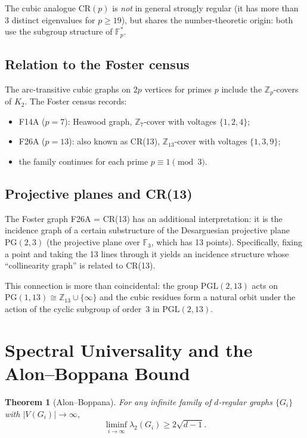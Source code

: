 \documentclass[11pt,a4paper]{article}
\theoremstyle{plain}
\newtheorem{theorem}{Theorem}
\theoremstyle{definition}
\theoremstyle{remark}
\newcommand{\Z}{\mathbb{Z}}
\newcommand{\F}{\mathbb{F}}
\newcommand{\CR}{\mathrm{CR}}
\begin{document}
The cubic analogue $\CR(p)$ is \emph{not} in general strongly regular
(it has more than 3 distinct eigenvalues for $p \ge 19$), but shares the
number-theoretic origin: both use the subgroup structure of $\F_p^*$.

\subsection{Relation to the Foster census}

The arc-transitive cubic graphs on $2p$ vertices for primes $p$ include
the $\Z_p$-covers of $K_2$. The Foster census records:
\begin{itemize}
  \item F14A ($p=7$): Heawood graph, $\Z_7$-cover with voltages $\{1,2,4\}$;
  \item F26A ($p=13$): also known as CR(13), $\Z_{13}$-cover with voltages $\{1,3,9\}$;
  \item the family continues for each prime $p \equiv 1 \pmod{3}$.
\end{itemize}

\subsection{Projective planes and CR(13)}

The Foster graph F26A = CR(13) has an additional interpretation: it is the
incidence graph of a certain substructure of the Desarguesian projective
plane $\mathrm{PG}(2,3)$ (the projective plane over $\F_3$, which has 13
points). Specifically, fixing a point and taking the 13 lines through it yields
an incidence structure whose ``collinearity graph'' is related to CR(13).

This connection is more than coincidental: the group $\mathrm{PGL}(2,13)$ acts
on $\mathrm{PG}(1,13) \cong \Z_{13} \cup \{\infty\}$ and the cubic residues
form a natural orbit under the action of the cyclic subgroup of order~3 in
$\mathrm{PGL}(2,13)$.


\section{Spectral Universality and the Alon--Boppana Bound}

\begin{theorem}[Alon--Boppana]
For any infinite family of $d$-regular graphs $\{G_i\}$ with $|V(G_i)| \to \infty$,
\[
  \liminf_{i \to \infty} \lambda_2(G_i) \ge 2\sqrt{d-1}.
\]
\end{theorem}
\end{document}
